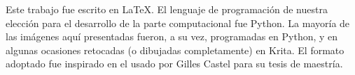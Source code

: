 \documentclass[a4paper,oneside,11pt]{extreport}
\begin{document}
\maketitle







\begin{center}
Este trabajo fue escrito en \LaTeX.
El lenguaje de programación de nuestra elección
para el desarrollo de la parte computacional 
fue Python.
La mayoría de las imágenes aquí presentadas fueron,
a su vez, programadas en Python, y en algunas ocasiones
retocadas (o dibujadas completamente) en Krita. 
El formato adoptado fue inspirado en el usado 
por Gilles Castel para su tesis de maestría.
\end{center}


\tableofcontents











\end{document}

